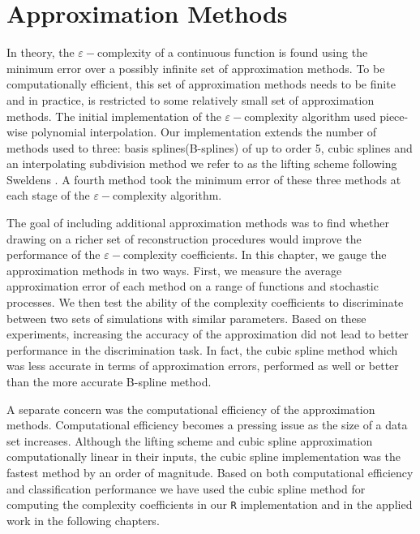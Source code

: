 \chapter{Approximation Methods}

In theory, the $\varepsilon-$complexity of a continuous function is found using the minimum error over a possibly infinite set of approximation methods. To be computationally efficient, this set of approximation methods needs to be finite and in practice, is restricted to some relatively small set of approximation methods. The initial implementation of the $\varepsilon-$complexity algorithm used piece-wise polynomial interpolation. Our implementation extends the number of methods used to three: basis splines(B-splines) of up to order 5, 
cubic splines and an interpolating subdivision method we refer to as the lifting scheme following Sweldens \cite{sweldens1998}. A fourth method took the minimum error of these three methods at each stage of the $\varepsilon-$complexity algorithm.

The goal of including additional approximation methods was to find whether drawing on a richer set of reconstruction procedures would improve the performance of the $\varepsilon-$complexity coefficients. In this chapter, we gauge the approximation methods in two ways. First, we measure the average approximation error of each method on a range of functions and stochastic processes. We then test the 
ability of the complexity coefficients to discriminate between two sets of simulations with similar parameters. Based on these experiments, increasing the accuracy of the approximation did not lead to better performance in the discrimination task. In fact, the cubic spline method which was less accurate in terms of approximation errors, performed as well or better than the more accurate B-spline method.

A separate concern was the computational efficiency of the approximation methods. Computational efficiency becomes a pressing issue as the size of a data set increases. Although the lifting 
scheme and cubic spline approximation computationally linear 
in their inputs, the cubic spline implementation was the 
fastest method by an order of magnitude. 
 Based on both computational efficiency and classification performance we have used the cubic spline method for computing the complexity coefficients in our \texttt{R} implementation and in the applied work in the following chapters.

